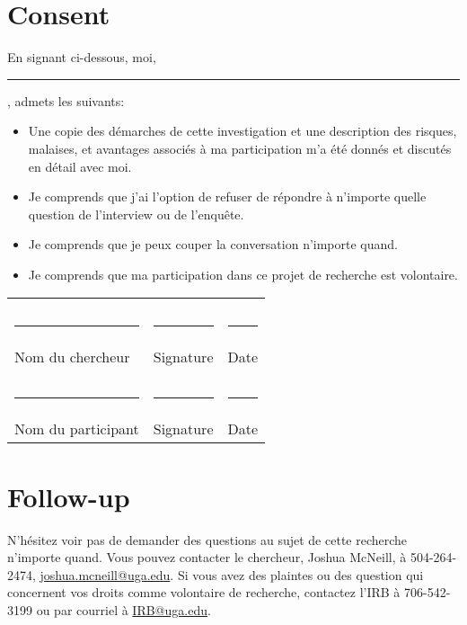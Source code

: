 \documentclass{article}
\begin{document}
    \section{Consent}
      En signant ci-dessous, moi, \rule{3cm}{0.4pt}, admets les suivants:
      \begin{itemize}
        \item Une copie des démarches de cette investigation et une description des risques, malaises, et avantages associés à ma participation m'a été donnés et discutés en détail avec moi.
        \item Je comprends que j'ai l'option de refuser de répondre à n'importe quelle question de l'interview ou de l'enquête.
        \item Je comprends que je peux couper la conversation n'importe quand.
        \item Je comprends que ma participation dans ce projet de recherche est volontaire.
      \end{itemize}

      \noindent\begin{tabular}{l l l}
                                       &                              & \\
                                       &                              & \\
        \rule{0.35\textwidth}{0.4pt}   & \rule{0.35\textwidth}{0.4pt} & \rule{0.2\textwidth}{0.4pt} \\
        Nom du chercheur               & Signature                    & Date \\
                                       &                              & \\
                                       &                              & \\
        \rule{0.35\textwidth}{0.4pt}   & \rule{0.35\textwidth}{0.4pt} & \rule{0.2\textwidth}{0.4pt} \\
        Nom du participant             & Signature                    & Date \\
      \end{tabular}

    \section{Follow-up}
      N'hésitez voir pas de demander des questions au sujet de cette recherche n'importe quand.
      Vous pouvez contacter le chercheur, Joshua McNeill, à 504-264-2474, \href{mailto:joshua.mcneill@uga.edu}{joshua.mcneill@uga.edu}.
      Si vous avez des plaintes ou des question qui concernent vos droits comme volontaire de recherche, contactez l'IRB à 706-542-3199 ou par courriel à \href{mailto:IRB@uga.edu}{IRB@uga.edu}.
  
\end{document}

